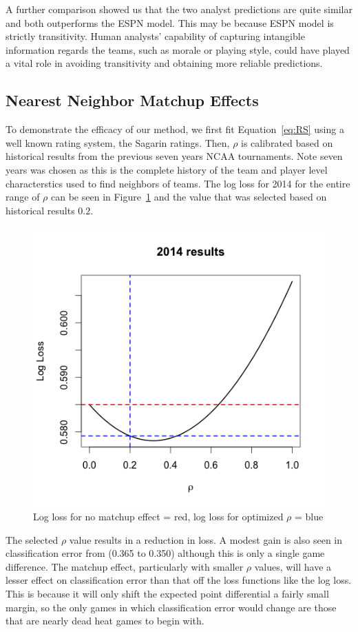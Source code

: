 A further comparison showed us that the two analyst predictions are quite similar and both outperforms the ESPN model. This may be because ESPN model is strictly transitivity. Human analysts' capability of capturing intangible information regards the teams, such as  morale or playing style, could have played a vital role in avoiding transitivity and obtaining more reliable predictions.         


\subsection{Nearest Neighbor Matchup Effects}
To demonstrate the efficacy of our method, we first fit Equation~\ref{eq:RS} using a well known rating system, the Sagarin ratings.  Then, $\rho$ is calibrated based on historical results from the previous seven years NCAA tournaments.  Note seven years was chosen as this is the complete history of the team and player level characterstics used to find neighbors of teams.   The log loss for 2014 for the entire range of $\rho$ can be seen in Figure~\ref{fig:result} and the value that was selected based on historical results $0.2$.
\begin{figure}[h]
\centering
\includegraphics[width=.7\textwidth]{results_2014.png}
\caption{Log loss for no matchup effect = red, log loss for optimized $\rho$ = blue}
\label{fig:result}
\end{figure}

The selected $\rho$ value results in a reduction in loss.  A modest gain is also seen in classification error from (0.365 to 0.350) although this is only a single game difference.  The matchup effect, particularly with smaller $\rho$ values, will have a lesser effect on classification error than that off the loss functions like the log loss.  This is because it will only shift the expected point differential a fairly small margin, so the only games in which classification error would change are those that are nearly dead heat games to begin with.

